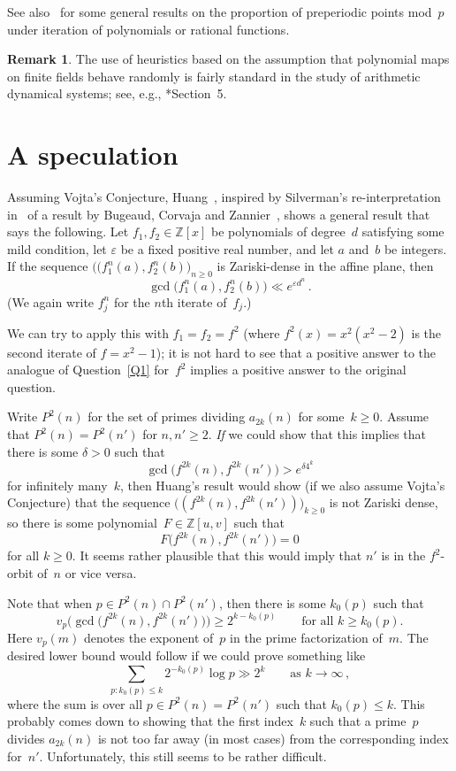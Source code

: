 \documentclass[12pt,a4paper]{amsart}
\newcommand{\Z}{{\mathbb Z}}
\newcommand{\eps}{\varepsilon}
\theoremstyle{definition}
\newtheorem{Remark}[Theorem]{Remark}
\numberwithin{equation}{section}
\begin{document}
See also~\cite{JKMT} for some general results on the proportion of preperiodic points
mod~$p$ under iteration of polynomials or rational functions.

\begin{Remark}
  The use of heuristics based on the assumption that polynomial maps
  on finite fields behave randomly is fairly standard in the study of
  arithmetic dynamical systems; see, e.g., \cite{BGHKST}*{Section~5}.
\end{Remark}



\section{A speculation} \label{S:speculation}

Assuming Vojta's Conjecture, Huang~\cite{Huang}, inspired by Silverman's
re-interpretation in~\cite{Silverman} of a result by Bugeaud, Corvaja
and Zannier~\cite{BCZ}, shows a general result that says the following.
Let $f_1, f_2 \in \Z[x]$ be polynomials of degree~$d$ satisfying some mild condition,
let $\eps$ be a fixed positive real number, and let $a$ and~$b$ be integers.
If the sequence $\bigl((f_1^n(a), f_2^n(b)\bigr)_{n \ge 0}$ is Zariski-dense
in the affine plane, then
\[ \gcd\bigl(f_1^n(a), f_2^n(b)\bigr) \ll e^{\eps d^n} \,. \]
(We again write $f_j^n$ for the $n$th iterate of~$f_j$.)

We can try to apply this with $f_1 = f_2 = f^2$ (where $f^2(x) = x^2 (x^2 - 2)$
is the second iterate of $f = x^2 - 1$); it is not hard to see that a positive
answer to the analogue of Question~\ref{Q1} for~$f^2$ implies a positive answer
to the original question.

Write $P^2(n)$ for the set of primes dividing $a_{2k}(n)$ for some~$k \ge 0$.
Assume that $P^2(n) = P^2(n')$ for $n, n' \ge 2$. \emph{If} we could show that this
implies that there is some $\delta > 0$ such that
\[ \gcd\bigl(f^{2k}(n), f^{2k}(n')\bigr) > e^{\delta 4^k} \]
for infinitely many~$k$, then Huang's result would show (if we also assume
Vojta's Conjecture) that the sequence $\bigl((f^{2k}(n), f^{2k}(n'))\bigr)_{k \ge 0}$
is not Zariski dense, so there is some polynomial~$F \in \Z[u, v]$ such that
\[ F\bigl(f^{2k}(n), f^{2k}(n')\bigr) = 0 \]
for all $k \ge 0$. It seems rather plausible that this would imply that $n'$
is in the $f^2$-orbit of~$n$ or vice versa.

Note that when $p \in P^2(n) \cap P^2(n')$, then there is some $k_0(p)$ such that
\[ v_p\bigl(\gcd\bigl(f^{2k}(n), f^{2k}(n')\bigr)\bigr) \ge 2^{k-k_0(p)}
    \qquad \text{for all $k \ge k_0(p)$.}
\]
Here $v_p(m)$ denotes the exponent of~$p$ in the prime factorization of~$m$.
The desired lower bound would follow if we could prove something like
\[ \sum_{p \colon k_0(p) \le k} 2^{-k_0(p)} \log p \gg 2^k \qquad \text{as $k \to \infty$} \,, \]
where the sum is over all $p \in P^2(n) = P^2(n')$ such that $k_0(p) \le k$.
This probably comes down to showing that the first index~$k$ such that
a prime~$p$ divides $a_{2k}(n)$ is not too far away (in most cases) from
the corresponding index for~$n'$. Unfortunately, this still seems to be
rather difficult.
\end{document}
